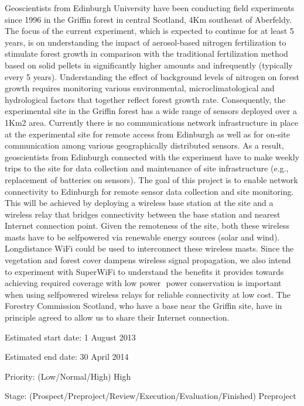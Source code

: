 \documentclass[draftclsnofoot,12pt,journal,onecolumn]{IEEEtran}
\begin{document}
Geoscientists from Edinburgh University have been conducting field experiments since 1996
in the Griffin forest in central Scotland, 4Km southeast of Aberfeldy. The focus of the current
experiment, which is expected to continue for at least 5 years, is on understanding the impact
of aerosol‐based nitrogen fertilization to stimulate forest growth in comparison with the
traditional fertilization method based on solid pellets in significantly higher amounts and
infrequently (typically every 5 years). Understanding the effect of background levels of
nitrogen on forest growth requires monitoring various environmental, micro­climatological
and hydrological factors that together reflect forest growth rate. Consequently, the
experimental site in the Griffin forest has a wide range of sensors deployed over a 1Km2 area.
Currently there is no communications network infrastructure in place at the experimental site for
remote access from Edinburgh as well as for on‐site communication among various
geographically distributed sensors. As a result, geoscientists from Edinburgh connected with
the experiment have to make weekly trips to the site for data collection and maintenance of
site infrastructure (e.g., replacement of batteries on sensors).
The goal of this project is to enable network connectivity to Edinburgh for remote sensor data
collection and site monitoring. This will be achieved by deploying a wireless base station at the
site and a wireless relay that bridges connectivity between the base station and nearest Internet
connection point. Given the remoteness of the site, both these wireless masts have to be
self­powered via renewable energy sources (solar and wind). Long­distance WiFi could be used
to interconnect these wireless masts. Since the vegetation and forest cover dampens wireless
signal propagation, we also intend to experiment with SuperWiFi to understand the benefits it
provides towards achieving required coverage with low power ­­ power conservation is important
when using self­powered wireless relays for reliable connectivity at low cost. The Forestry
Commission Scotland, who have a base near the Griffin site,  have in principle agreed to allow
us to share their Internet connection.

Estimated start date: 1 August 2013

Estimated end date: 30 April 2014

Priority: (Low/Normal/High) High

Stage: (Prospect/Pre­project/Review/Execution/Evaluation/Finished) Pre­project
\end{document}
